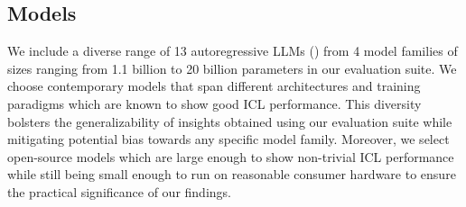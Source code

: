 

\subsection{Models}

We include a diverse range of 13 autoregressive LLMs () from 4 model families of sizes ranging from 1.1 billion to 20 billion parameters in our evaluation suite. We choose contemporary models that span different architectures and training paradigms which are known to show good ICL performance. This diversity bolsters the generalizability of insights obtained using our evaluation suite while mitigating potential bias towards any specific model family. Moreover, we select open-source models which are large enough to show non-trivial ICL performance while still being small enough to run on reasonable consumer hardware to ensure the practical significance of our findings.
